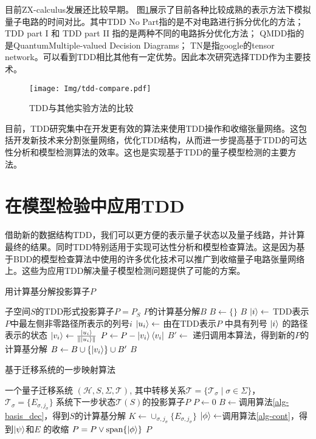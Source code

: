 目前ZX-calculus发展还比较早期。
图\ref{fig:tdd-compare}展示了目前各种比较成熟的表示方法下模拟量子电路的时间对比。其中TDD No Part指的是不对电路进行拆分优化的方法；TDD part I 和 TDD part II 指的是两种不同的电路拆分优化方法；
QMDD指的是QuantumMultiple-valued Decision Diagrams；
TN是指google的tensor network。可以看到TDD相比其他有一定优势。因此本次研究选择TDD作为主要技术。

\begin{figure}[!htbp]
    \centering
    \texttt{[image: Img/tdd-compare.pdf]}
    \caption{TDD与其他实验方法的比较\citep{Hong_2022}}
    \label{fig:tdd-compare}
\end{figure}

目前，TDD研究集中在开发更有效的算法来使用TDD操作和收缩张量网络。这包括开发新技术来分割张量网络，优化TDD结构，从而进一步提高基于TDD的可达性分析和模型检测算法的效率。这也是实现基于TDD的量子模型检测的主要方法。

\section{在模型检验中应用TDD}
借助新的数据结构TDD，我们可以更方便的表示量子状态以及量子线路，并计算最终的结果。同时TDD特别适用于实现可达性分析和模型检查算法。这是因为基于BDD的模型检查算法中使用的许多优化技术可以推广到收缩量子电路张量网络上\citep{Chaki_2018}。这些为应用TDD解决量子模型检测问题提供了可能的方案。
\begin{algorithm} 
\caption{用计算基分解投影算子$P$}
\label{alg-basis_dec} 
\begin{algorithmic}[1]
    \Require 子空间$S$的TDD形式投影算子$P=P_S$ 
    \Ensure $P$的计算基分解$B$
    \State $B\gets \{\}$
        \Return \(B\)
    \Else
        \State \(\ket{i} \gets\) TDD表示\(P\)中最左侧非零路径所表示的列号\(i\)
        \State \(\ket{u_i}\gets\) 由在TDD表示\(P\) 中具有列号 \(\ket{i}\) 的路径表示的状态
        \State \(\ket{v_i} \gets \frac{\ket{u_i}}{\|\ket{u_i}\|}\)
        \State \(P \gets P - \ket{v_i}\bra{v_i}\)
        \State \(B' \gets \) 递归调用本算法，得到新的$P$的计算基分解
        \State \(B \gets B \cup \{\ket{v_i}\} \cup B'\)
    \EndIf
    \State \Return \(B\)
\end{algorithmic}
\end{algorithm}
\begin{algorithm}
\caption{基于迁移系统的一步映射算法}
\label{alg-image}
\begin{algorithmic}[1] %
\Require 一个量子迁移系统 $(\mathcal{H},S,\Sigma,\mathcal{T})$, 其中转移关系$\mathcal{T}=\{\mathcal{T}_\sigma\mid \sigma\in \Sigma\}$，  $\mathcal{T}_\sigma=\{E_{\sigma,j_\sigma}\}$
\Ensure 系统下一步状态$\mathcal{T}(S)$的投影算子$P$
\State $P \gets 0$ 
\State $B \gets $调用算法\ref{alg-basis_dec}，得到$S$的计算基分解
\State $K \gets \cup_{\sigma,j_\sigma}\{E_{\sigma,j_\sigma}\}$
    \State $\ket{\phi} \gets $调用算法\ref{alg-cont}，得到\(\ket{\psi}\)和\(E\) 的收缩
    \State $P=P \vee \text{span}\{\ket{\phi}\}$
\EndFor
\State \Return $P$ 
\end{algorithmic}
\end{algorithm}

